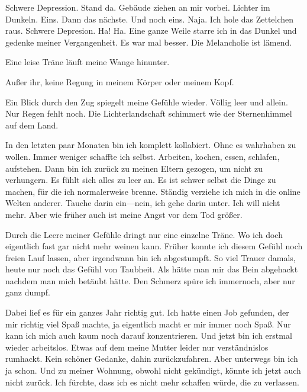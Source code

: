 \documentclass{article}
\title{\titlevar}
\author{\authorvar}
\date{\datevar}
\begin{document}
	\maketitle

	Schwere Depression. Stand da. Gebäude ziehen an mir vorbei. Lichter im Dunkeln. Eins. Dann das nächste. Und noch eins. Naja. Ich hole das Zettelchen raus. Schwere Depresion. Ha! Ha. Eine ganze Weile starre ich in das Dunkel und gedenke meiner Vergangenheit. Es war mal besser. Die Melancholie ist lämend.

	\medskip

	Eine leise Träne läuft meine Wange hinunter.

	\medskip

	Außer ihr, keine Regung in meinem Körper oder meinem Kopf.

	\medskip

	Ein Blick durch den Zug spiegelt meine Gefühle wieder. Völlig leer und allein. Nur Regen fehlt noch. Die Lichterlandschaft schimmert wie der Sternenhimmel auf dem Land.

	\medskip

	In den letzten paar Monaten bin ich komplett kollabiert. Ohne es wahrhaben zu wollen. Immer weniger schaffte ich selbst. Arbeiten, kochen, essen, schlafen, aufstehen. Dann bin ich zurück zu meinen Eltern gezogen, um nicht zu verhungern. Es fühlt sich alles zu leer an. Es ist schwer selbst die Dinge zu machen, für die ich normalerweise brenne. Ständig verziehe ich mich in die online Welten anderer. Tauche darin ein—nein, ich gehe darin unter. Ich will nicht mehr. Aber wie früher auch ist meine Angst vor dem Tod größer.

	\medskip

	Durch die Leere meiner Gefühle dringt nur eine einzelne Träne. Wo ich doch eigentlich fast gar nicht mehr weinen kann. Früher konnte ich diesem Gefühl noch freien Lauf lassen, aber irgendwann bin ich abgestumpft. So viel Trauer damals, heute nur noch das Gefühl von Taubheit. Als hätte man mir das Bein abgehackt nachdem man mich betäubt hätte. Den Schmerz spüre ich immernoch, aber nur ganz dumpf.

	\medskip

	Dabei lief es für ein ganzes Jahr richtig gut. Ich hatte einen Job gefunden, der mir richtig viel Spaß machte, ja eigentlich macht er mir immer noch Spaß. Nur kann ich mich auch kaum noch darauf konzentrieren. Und jetzt bin ich erstmal wieder arbeitslos. Etwas auf dem meine Mutter leider nur verständnislos rumhackt. Kein schöner Gedanke, dahin zurückzufahren. Aber unterwegs bin ich ja schon. Und zu meiner Wohnung, obwohl nicht gekündigt, könnte ich jetzt auch nicht zurück. Ich fürchte, dass ich es nicht mehr schaffen würde, die zu verlassen.
\end{document}
